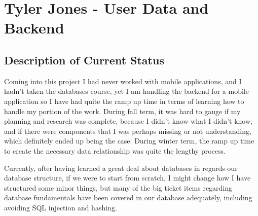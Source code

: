\documentclass[letterpaper,10pt,titlepage,journal,compsoc,draftclsnofoot,onecolumn]{IEEEtran}
\begin{document}
     
     
     
 
    

\section{Tyler Jones - User Data and Backend}

\subsection{Description of Current Status}
 Coming into this project I had never worked with mobile applications, and I hadn't taken the databases course, yet I am handling the backend for a mobile application so I have had quite the ramp up time in terms of learning how to handle my portion of the work. During fall term, it was hard to gauge if my planning and research was complete, because I didn't know what I didn't know, and if there were components that I was perhaps missing or not understanding, which definitely ended up being the case. During winter term, the ramp up time to create the necessary data relationship was quite the lengthy process.

Currently, after having learned a great deal about databases in regards our database structure, if we were to start from scratch, I might change how I have structured some minor things, but many of the big ticket items regarding database fundamentals have been covered in our database adequately, including avoiding SQL injection and hashing.
\end{document}
